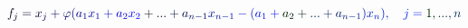 \documentclass[12pt]{article}
\begin{document}
\makeatletter
\renewcommand*{\@textcolor}[3]{%
  \protect\leavevmode
  \begingroup
    \color#1{#2}#3%
  \endgroup
}
\makeatother
\begin{displaymath}
\mathcolor[RGB]{0,0,15}{f} _ { \mathcolor[RGB]{0,0,30}{j} } \mathcolor[RGB]{0,0,45}{=} \mathcolor[RGB]{0,0,60}{x} _ { \mathcolor[RGB]{0,0,75}{j} } \mathcolor[RGB]{0,0,90}{+} \mathcolor[RGB]{0,0,105}{\varphi} \mathcolor[RGB]{0,0,120}{(} \mathcolor[RGB]{0,0,135}{a} _ { \mathcolor[RGB]{0,0,150}{1} } \mathcolor[RGB]{0,0,165}{x} _ { \mathcolor[RGB]{0,0,180}{1} } \mathcolor[RGB]{0,0,195}{+} \mathcolor[RGB]{0,0,210}{a} _ { \mathcolor[RGB]{0,0,225}{2} } \mathcolor[RGB]{0,0,240}{x} _ { \mathcolor[RGB]{0,0,255}{2} } \mathcolor[RGB]{0,15,0}{+} \mathcolor[RGB]{0,15,15}{.} \mathcolor[RGB]{0,15,30}{.} \mathcolor[RGB]{0,15,45}{.} \mathcolor[RGB]{0,15,60}{+} \mathcolor[RGB]{0,15,75}{a} _ { \mathcolor[RGB]{0,15,90}{n} \mathcolor[RGB]{0,15,105}{-} \mathcolor[RGB]{0,15,120}{1} } \mathcolor[RGB]{0,15,135}{x} _ { \mathcolor[RGB]{0,15,150}{n} \mathcolor[RGB]{0,15,165}{-} \mathcolor[RGB]{0,15,180}{1} } \mathcolor[RGB]{0,15,195}{-} \mathcolor[RGB]{0,15,210}{(} \mathcolor[RGB]{0,15,225}{a} _ { \mathcolor[RGB]{0,15,240}{1} } \mathcolor[RGB]{0,15,255}{+} \mathcolor[RGB]{0,30,0}{a} _ { \mathcolor[RGB]{0,30,15}{2} } \mathcolor[RGB]{0,30,30}{+} \mathcolor[RGB]{0,30,45}{.} \mathcolor[RGB]{0,30,60}{.} \mathcolor[RGB]{0,30,75}{.} \mathcolor[RGB]{0,30,90}{+} \mathcolor[RGB]{0,30,105}{a} _ { \mathcolor[RGB]{0,30,120}{n} \mathcolor[RGB]{0,30,135}{-} \mathcolor[RGB]{0,30,150}{1} } \mathcolor[RGB]{0,30,165}{)} \mathcolor[RGB]{0,30,180}{x} _ { \mathcolor[RGB]{0,30,195}{n} } \mathcolor[RGB]{0,30,210}{)} \mathcolor[RGB]{0,30,225}{,} \quad \mathcolor[RGB]{0,30,240}{j} \mathcolor[RGB]{0,30,255}{=} \mathcolor[RGB]{0,45,0}{1} \mathcolor[RGB]{0,45,15}{,} \mathcolor[RGB]{0,45,30}{.} \mathcolor[RGB]{0,45,45}{.} \mathcolor[RGB]{0,45,60}{.} \mathcolor[RGB]{0,45,75}{,} \mathcolor[RGB]{0,45,90}{n}
\end{displaymath}
\end{document}
